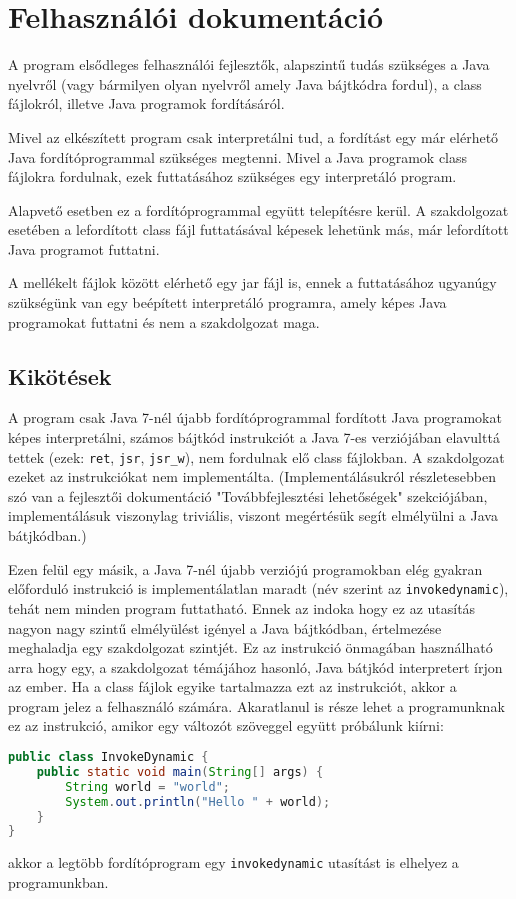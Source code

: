 \chapter{Felhasználói dokumentáció}
\label{ch:user}

A program elsődleges felhasználói fejlesztők, alapszintű tudás szükséges a Java nyelvről (vagy bármilyen olyan nyelvről amely Java bájtkódra fordul), a class fájlokról, illetve Java programok fordításáról.

Mivel az elkészített program csak interpretálni tud, a fordítást egy már elérhető Java fordítóprogrammal szükséges megtenni. Mivel a Java programok class fájlokra fordulnak, ezek futtatásához szükséges egy interpretáló program.

Alapvető esetben ez a fordítóprogrammal együtt telepítésre kerül. A szakdolgozat esetében a lefordított class fájl futtatásával képesek lehetünk más, már lefordított Java programot futtatni.

A mellékelt fájlok között elérhető egy jar fájl is, ennek a futtatásához ugyanúgy szükségünk van egy beépített interpretáló programra, amely képes Java programokat futtatni és nem a szakdolgozat maga.

\section{Kikötések}
A program csak Java 7-nél újabb fordítóprogrammal fordított Java programokat képes interpretálni, számos bájtkód instrukciót a Java 7-es verziójában elavulttá tettek (ezek: \lstinline{ret}, \lstinline{jsr}, \lstinline{jsr_w}), nem fordulnak elő class fájlokban. A szakdolgozat ezeket az instrukciókat nem implementálta. (Implementálásukról részletesebben szó van a fejlesztői dokumentáció "Továbbfejlesztési lehetőségek" szekciójában, implementálásuk viszonylag triviális, viszont megértésük segít elmélyülni a Java bátjkódban.)

Ezen felül egy másik, a Java 7-nél újabb verziójú programokban elég gyakran előforduló instrukció is implementálatlan maradt (név szerint az \lstinline{invokedynamic}), tehát nem minden program futtatható. Ennek az indoka hogy ez az utasítás nagyon nagy szintű elmélyülést igényel a Java bájtkódban, értelmezése meghaladja egy szakdolgozat szintjét. Ez az instrukció önmagában használható arra hogy egy, a szakdolgozat témájához hasonló, Java bátjkód interpretert írjon az ember. Ha a class fájlok egyike tartalmazza ezt az instrukciót, akkor a program jelez a felhasználó számára. Akaratlanul is része lehet a programunknak ez az instrukció, amikor egy változót szöveggel együtt próbálunk kiírni:
\begin{lstlisting}[language={Java}]
public class InvokeDynamic {
	public static void main(String[] args) {
		String world = "world";
		System.out.println("Hello " + world);
	}
}
\end{lstlisting}
akkor a legtöbb fordítóprogram egy \lstinline{invokedynamic} utasítást is elhelyez a programunkban.

